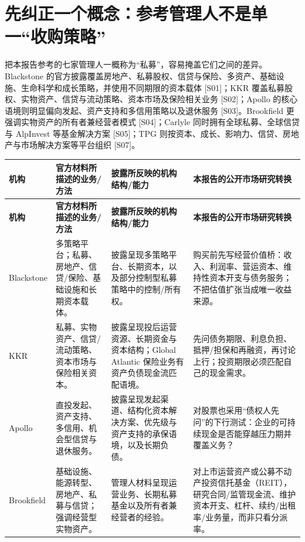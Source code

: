 \section{先纠正一个概念：参考管理人不是单一“收购策略”}

把本报告参考的七家管理人一概称为“私募”，容易掩盖它们之间的差异。Blackstone 的官方披露覆盖房地产、私募股权、信贷与保险、多资产、基础设施、生命科学和成长策略，并使用不同期限的资本载体 [S01]；KKR 覆盖私募股权、实物资产、信贷与流动策略、资本市场及保险相关业务 [S02]；Apollo 的核心语境则明显偏向发起、资产支持和多信用策略以及退休服务 [S03]。Brookfield 更强调实物资产的所有者兼经营者模式 [S04]；Carlyle 同时拥有全球私募、全球信贷与 AlpInvest 等基金解决方案 [S05]；TPG 则按资本、成长、影响力、信贷、房地产与市场解决方案等平台组织 [S07]。

\begin{exhibitbox}
\scriptsize
\begin{longtable}{L{2.0cm} L{3.4cm} L{4.0cm} L{4.0cm}}
\toprule
\textbf{机构} & \textbf{官方材料所描述的业务/方法} & \textbf{披露所反映的机构结构/能力} & \textbf{本报告的公开市场研究转换} \\
\midrule
\endfirsthead
\toprule
\textbf{机构} & \textbf{官方材料所描述的业务/方法} & \textbf{披露所反映的机构结构/能力} & \textbf{本报告的公开市场研究转换} \\
\midrule
\endhead
Blackstone & 多策略平台；私募、房地产、信贷/保险、基础设施和长期资本载体。 & 披露呈现多策略平台、长期资本，以及部分控制型私募策略中的控制/所有权。 & 购买前先写经营价值桥：收入、利润率、营运资本、维持性资本开支与债务服务；不把估值扩张当成唯一收益来源。 \\
KKR & 私募、实物资产、信贷/流动策略、资本市场与保险相关资本。 & 披露呈现投后运营资源、长期资金与资本结构；Global Atlantic 保险业务有资产负债现金流匹配语境。 & 先问债务期限、利息负担、抵押/担保和再融资，再讨论上行；投资期限必须匹配自己的现金需求。 \\
Apollo & 直投发起、资产支持、多信用、机会型信贷与退休服务。 & 披露呈现发起渠道、结构化资本解决方案、优先级与资产支持的承保语境，以及长期负债。 & 对股票也采用“债权人先问”的下行测试：企业的可持续现金是否能穿越压力期并覆盖义务？ \\
Brookfield & 基础设施、能源转型、房地产、私募与信贷；强调经营型实物资产。 & 管理人材料呈现运营业务、长期私募基金以及所有者兼经营者的经验。 & 对上市运营资产或公募不动产投资信托基金（REIT），研究合同/监管现金流、维护资本开支、杠杆、续约/出租率/业务量，而非只看分派率。 \\

\end{longtable}
\end{exhibitbox}
